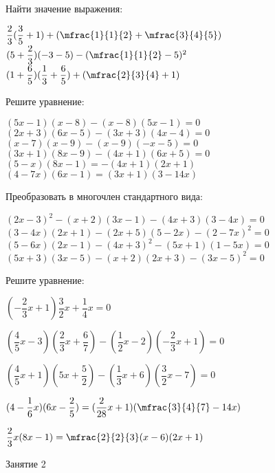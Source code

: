 %
%

\begin{class}[number=1]
	\begin{listofex}
		\item Найти значение выражения:
		\begin{itasks}[1]
			\task \( \dfrac{2}{3}(\dfrac{3}{5}+1)+(\mfrac{1}{1}{2}+\mfrac{3}{4}{5}) \)
			\task \( (5+\dfrac{2}{3})(-3-5)-(\mfrac{1}{1}{2}-5)^2 \)
			\task \( (1+\dfrac{6}{5})(\dfrac{1}{3}+\dfrac{6}{5})+(\mfrac{2}{3}{4}+1) \)
		\end{itasks}
		\item Решите уравнение:
		\begin{itasks}[1]
			\task \( (5x-1)(x-8)-(x-8)(5x-1)=0 \)
			\task \( (2x+3)(6x-5)-(3x+3)(4x-4)=0 \)
			\task \( (x-7)(x-9)-(x-9)(-x-5)=0 \)
			\task \( (3x+1)(8x-9)-(4x+1)(6x+5)=0 \)
			\task \( (5-x)(8x-1)=-(4x+1)(2x+1) \)
			\task \( (4-7x)(6x-1)=(3x+1)(3-14x) \)
		\end{itasks}
		\item Преобразовать в многочлен стандартного вида:
		\begin{itasks}[1]
			\task \( (2x-3)^2-(x+2)(3x-1)-(4x+3)(3-4x)=0 \)
			\task \( (3-4x)(2x+1)-(2x+5)(5-2x)-(2-7x)^2=0 \)
			\task \( (5-6x)(2x-1)-(4x+3)^2-(5x+1)(1-5x)=0 \)
			\task \( (5x+3)(3x-5)-(x+2)(2x+3)-(3x-5)^2=0 \)
		\end{itasks}
		\item Решите уравнение:
		\begin{itasks}[1]
			\task \( (-\dfrac{2}{3}x+1)\dfrac{3}{2}x+\dfrac{1}{4}x=0 \)
			
			\task \( (\dfrac{4}{5}x-3)(\dfrac{2}{3}x+\dfrac{6}{7})-(\dfrac{1}{2}x-2) (-\dfrac{2}{3}x+1)=0 \)
			
			\task \( (\dfrac{4}{5}x+1)(5x+\dfrac{5}{2})-(\dfrac{1}{3}x+6) (\dfrac{3}{2}x-7)=0 \)
			
			\task \( (4-\dfrac{1}{6}x)(6x-\dfrac{2}{5})=(\dfrac{2}{28}x+1)(\mfrac{3}{4}{7}-14x) \)
			
			\task \( \dfrac{2}{3}x(8x-1)=\mfrac{2}{2}{3}(x-6)(2x+1) \)
		\end{itasks}
	\end{listofex}
\end{class}

\begin{class}[number=2]
	\begin{listofex}
		\item Занятие 2
	\end{listofex}
\end{class}

